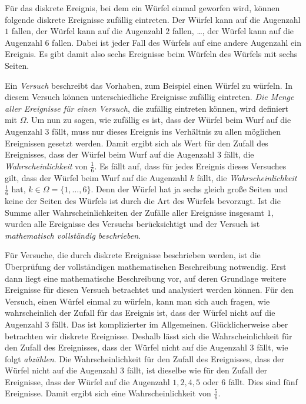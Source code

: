 ﻿\documentclass[12pt,a4paper]{article}
\theoremstyle{definition}
\theoremstyle{plain}
\theoremstyle{remark}
\begin{document}
Für das diskrete Ereignis, bei dem ein Würfel einmal geworfen wird, können
folgende diskrete Ereignisse zufällig eintreten. Der Würfel kann auf die
Augenzahl $1$ fallen, der Würfel kann auf die Augenzahl $2$ fallen, \ldots,
der Würfel kann auf die Augenzahl $6$ fallen. Dabei ist jeder Fall des Würfels
auf eine andere Augenzahl ein Ereignis. Es gibt damit also sechs Ereignisse
beim Würfeln des Würfels mit sechs Seiten.

Ein \textit{Versuch} beschreibt das Vorhaben, zum Beispiel einen Würfel zu
würfeln. In diesem Versuch können unterschiedliche Ereignisse zufällig
eintreten. \textit{Die Menge aller Ereignisse für einen Versuch}, die
zufällig eintreten können, wird definiert mit $\Omega$. Um nun zu sagen, wie
zufällig es ist, dass der Würfel beim Wurf auf die Augenzahl $3$ fällt, muss
nur dieses Ereignis ins Verhältnis zu allen möglichen Ereignissen gesetzt
werden. Damit ergibt sich als Wert für den Zufall des Ereignisses, dass der
Würfel beim Wurf auf die Augenzahl $3$ fällt, die \textit{Wahrscheinlichkeit}
von $\frac{1}{6}$. Es fällt auf, dass für jedes Ereignis dieses Versuches
gilt, dass der Würfel beim Wurf auf die Augenzahl $k$ fällt, die
\textit{Wahrscheinlichkeit} $\frac{1}{6}$ hat, $k \in \Omega = \{1, \ldots, 6\}$.
Denn der Würfel hat ja sechs gleich große Seiten und keine der Seiten des
Würfels ist durch die Art des Würfels bevorzugt. Ist die Summe aller
Wahrscheinlichkeiten der Zufälle aller Ereignisse insgesamt $1$, wurden alle
Ereignisse des Versuchs berücksichtigt und der Versuch ist
\textit{mathematisch vollständig beschrieben}.

Für Versuche, die durch diskrete Ereignisse beschrieben werden, ist die
Überprüfung der vollständigen mathematischen Beschreibung notwendig. Erst dann
liegt eine mathematische Beschreibung vor, auf deren Grundlage weitere
Ereignisse für diesen Versuch betrachtet und analysiert werden können. Für
den Versuch, einen Würfel einmal zu würfeln, kann man sich auch fragen, wie
wahrscheinlich der Zufall für das Ereignis ist, dass der Würfel nicht auf die
Augenzahl $3$ fällt. Das ist komplizierter im Allgemeinen. Glücklicherweise
aber betrachten wir diskrete Ereignisse. Deshalb lässt sich die
Wahrscheinlichkeit für den Zufall des Ereignisses, dass der Würfel nicht auf
die Augenzahl $3$ fällt, wie folgt \textit{abzählen}. Die Wahrscheinlichkeit
für den Zufall des Ereignisses, dass der Würfel nicht auf die Augenzahl $3$
fällt, ist dieselbe wie für den Zufall der Ereignisse, dass der Würfel auf
die Augenzahl $1, 2, 4, 5$ oder $6$ fällt. Dies sind fünf Ereignisse. Damit
ergibt sich eine Wahrscheinlichkeit von $\frac{5}{6}$.
\end{document}
